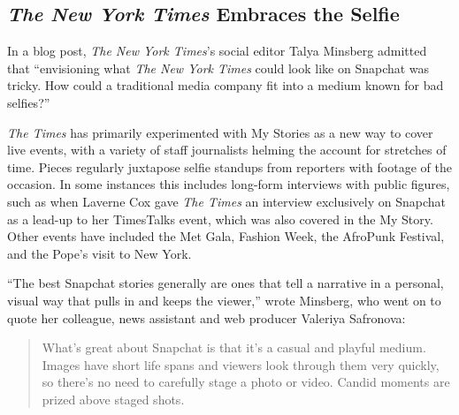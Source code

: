 \documentclass[notoc, symmetric, nobib, nols]{towcenter-guideto-book}
\begin{document}
\subsection[The New York Times Embraces the Selfie]{\textit{The New York Times} Embraces the Selfie}

In a blog post, \textit{The New York Times}'s social editor Talya Minsberg admitted that ``envisioning what \textit{The New York Times} could look like on Snapchat was tricky.\autocite{NYTsnapchat} How could a traditional media company fit into a medium known for bad selfies?''

\textit{The Times} has primarily experimented with My Stories as a new way to cover live events, with a variety of staff journalists helming the account for stretches of time. Pieces regularly juxtapose selfie standups from reporters with footage of the occasion.  In some instances this includes long-form interviews with public figures, such as when Laverne Cox gave \textit{The Times} an interview exclusively on Snapchat as a lead-up to her TimesTalks event, which was also covered in the My Story. Other events have included the Met Gala, Fashion Week, the AfroPunk Festival, and the Pope's visit to New York.  

``The best Snapchat stories generally are ones that tell a narrative in a personal, visual way that pulls in and keeps the viewer,'' wrote Minsberg, who went on to quote her colleague, news assistant and web producer Valeriya Safronova: 

\begin{quote}
What's great about Snapchat is that it's a casual and playful medium. Images have short life spans and viewers look through them very quickly, so there's no need to carefully stage a photo or video. Candid moments are prized above staged shots. 
\end{quote}



\end{document}

